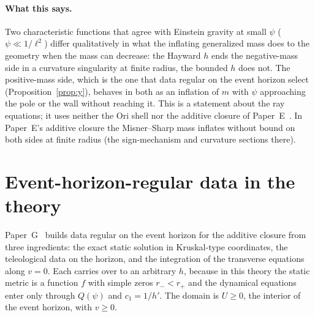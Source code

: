 \documentclass[11pt]{article}
\begin{document}
\paragraph{What this says.} Two characteristic functions that agree with Einstein gravity at small $\psi$ ($\psi\ll1/\ell^{2}$) differ qualitatively in what the inflating generalized mass does to the geometry when the mass can decrease: the Hayward $h$ ends the negative-mass side in a curvature singularity at finite radius, the bounded $h$ does not. The positive-mass side, which is the one that data regular on the event horizon select (Proposition~\ref{prop:y}), behaves in both as an inflation of $m$ with $\psi$ approaching the pole or the wall without reaching it. This is a statement about the ray equations; it uses neither the Ori shell nor the additive closure of Paper~E~\citep{PaperE}. In Paper~E's additive closure the Misner--Sharp mass inflates without bound on both sides at finite radius (the sign-mechanism and curvature sections there).

\section{Event-horizon-regular data in the theory}
\label{sec:ehdata}

Paper~G~\citep{PaperG} builds data regular on the event horizon for the additive closure from three ingredients: the exact static solution in Kruskal-type coordinates, the teleological data on the horizon, and the integration of the transverse equations along $v=0$. Each carries over to an arbitrary $h$, because in this theory the static metric is a function $f$ with simple zeros $r_-<r_+$ and the dynamical equations enter only through $Q(\psi)$ and $c_1=1/h'$. The domain is $U\ge0$, the interior of the event horizon, with $v\ge0$.
\end{document}
